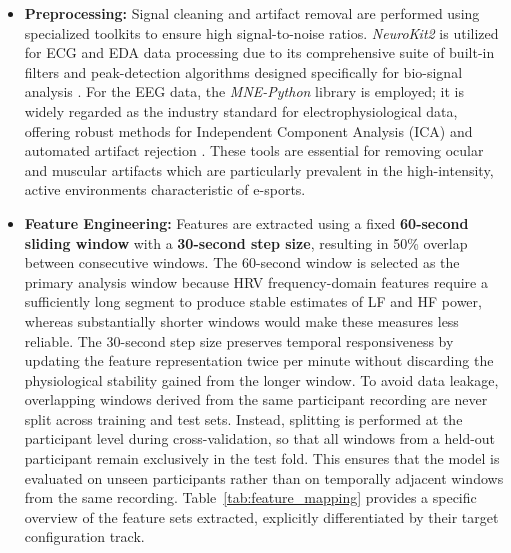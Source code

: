 \begin{itemize}
\item \textbf{Preprocessing:} Signal cleaning and artifact removal are performed using specialized toolkits to ensure high signal-to-noise ratios. \textit{NeuroKit2} is utilized for ECG and EDA data processing due to its comprehensive suite of built-in filters and peak-detection algorithms designed specifically for bio-signal analysis \autocite{makowski2021neurokit2}. For the EEG data, the \textit{MNE-Python} library is employed; it is widely regarded as the industry standard for electrophysiological data, offering robust methods for Independent Component Analysis (ICA) and automated artifact rejection \autocite{gramfort2013mne}. These tools are essential for removing ocular and muscular artifacts which are particularly prevalent in the high-intensity, active environments characteristic of e-sports.

\pagebreak[3]
\item \textbf{Feature Engineering:} Features are extracted using a fixed \textbf{60-second sliding window} with a \textbf{30-second step size}, resulting in 50\% overlap between consecutive windows. The 60-second window is selected as the primary analysis window because HRV frequency-domain features require a sufficiently long segment to produce stable estimates of LF and HF power, whereas substantially shorter windows would make these measures less reliable. The 30-second step size preserves temporal responsiveness by updating the feature representation twice per minute without discarding the physiological stability gained from the longer window. To avoid data leakage, overlapping windows derived from the same participant recording are never split across training and test sets. Instead, splitting is performed at the participant level during cross-validation, so that all windows from a held-out participant remain exclusively in the test fold. This ensures that the model is evaluated on unseen participants rather than on temporally adjacent windows from the same recording. Table~\ref{tab:feature_mapping} provides a specific overview of the feature sets extracted, explicitly differentiated by their target configuration track.


\end{itemize}
